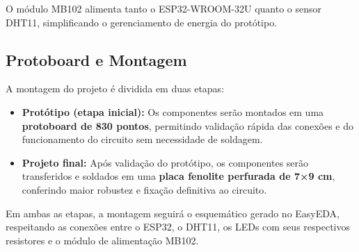O módulo MB102 alimenta tanto o ESP32-WROOM-32U quanto o sensor DHT11,
simplificando o gerenciamento de energia do protótipo.

\subsection{Protoboard e Montagem}

A montagem do projeto é dividida em duas etapas:

\begin{itemize}
    \item \textbf{Protótipo (etapa inicial):} Os componentes serão montados em uma
    \textbf{protoboard de 830 pontos}, permitindo validação rápida das conexões e
    do funcionamento do circuito sem necessidade de soldagem.

    \item \textbf{Projeto final:} Após validação do protótipo, os componentes serão
    transferidos e soldados em uma \textbf{placa fenolite perfurada de 7×9 cm},
    conferindo maior robustez e fixação definitiva ao circuito.
\end{itemize}

Em ambas as etapas, a montagem seguirá o esquemático gerado no EasyEDA,
respeitando as conexões entre o ESP32, o DHT11, os LEDs com seus respectivos
resistores e o módulo de alimentação MB102.
